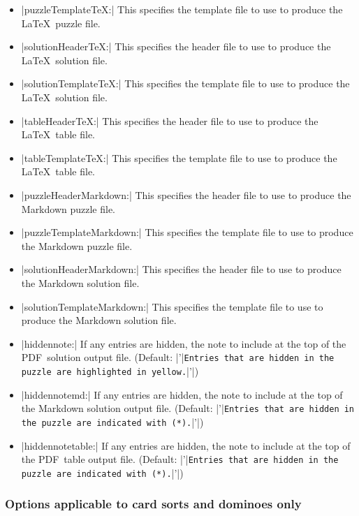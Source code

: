 \documentclass{article}
\def\PDF{{\small PDF}}
\begin{document}
\begin{itemize}
  produce the \LaTeX\ puzzle file.  See the later section on templates
  (\ref{sec:templates}) for more information on header and template
  files.
\item |puzzleTemplateTeX:| This specifies the template file to
  use to produce the \LaTeX\ puzzle file.
\item |solutionHeaderTeX:| This specifies the header file to
  use to produce the \LaTeX\ solution file.
\item |solutionTemplateTeX:| This specifies the template file to
  use to produce the \LaTeX\ solution file.
\item |tableHeaderTeX:| This specifies the header file to
  use to produce the \LaTeX\ table file.
\item |tableTemplateTeX:| This specifies the template file to
  use to produce the \LaTeX\ table file.
\item |puzzleHeaderMarkdown:| This specifies the header file to
  use to produce the Markdown puzzle file.
\item |puzzleTemplateMarkdown:| This specifies the template file to
  use to produce the Markdown puzzle file.
\item |solutionHeaderMarkdown:| This specifies the header file to
  use to produce the Markdown solution file.
\item |solutionTemplateMarkdown:| This specifies the template file to
  use to produce the Markdown solution file.
\item |hiddennote:| If any entries are hidden, the note to include at
  the top of the \PDF\ solution output file.  (Default:
  |'|\texttt{Entries that are hidden in the puzzle are highlighted in
    yellow.}|'|)
\item |hiddennotemd:| If any entries are hidden, the note to include
  at the top of the Markdown solution output file.  (Default:
  |'|\texttt{Entries that are hidden in the puzzle are indicated with
    (*).}|'|)
\item |hiddennotetable:| If any entries are hidden, the note to
  include at the top of the \PDF\ table output file.  (Default:
  |'|\texttt{Entries that are hidden in the puzzle are indicated with
    (*).}|'|)
\end{itemize}

\subsubsection*{Options applicable to card sorts and dominoes only}
\end{document}
